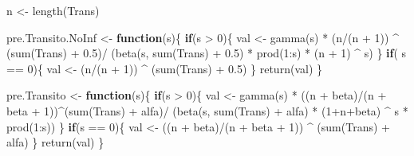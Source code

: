 \documentclass[
  12pt,
  spanish,
]{book}
\newenvironment{Shaded}{\begin{snugshade}}{\end{snugshade}}
\newcommand{\ControlFlowTok}[1]{\textcolor[rgb]{0.13,0.29,0.53}{\textbf{#1}}}
\newcommand{\DecValTok}[1]{\textcolor[rgb]{0.00,0.00,0.81}{#1}}
\newcommand{\FloatTok}[1]{\textcolor[rgb]{0.00,0.00,0.81}{#1}}
\newcommand{\FunctionTok}[1]{\textcolor[rgb]{0.00,0.00,0.00}{#1}}
\newcommand{\NormalTok}[1]{#1}
\newcommand{\OtherTok}[1]{\textcolor[rgb]{0.56,0.35,0.01}{#1}}
\newcommand{\SpecialCharTok}[1]{\textcolor[rgb]{0.00,0.00,0.00}{#1}}
\theoremstyle{definition}
\theoremstyle{definition}
\theoremstyle{definition}
\theoremstyle{definition}
\theoremstyle{remark}
\begin{document}
\begin{Shaded}
\begin{Highlighting}[]
\NormalTok{n }\OtherTok{\textless{}{-}} \FunctionTok{length}\NormalTok{(Trans)}

\NormalTok{pre.Transito.NoInf }\OtherTok{\textless{}{-}} \ControlFlowTok{function}\NormalTok{(s)\{}
  \ControlFlowTok{if}\NormalTok{(s }\SpecialCharTok{\textgreater{}} \DecValTok{0}\NormalTok{)\{}
\NormalTok{    val }\OtherTok{\textless{}{-}} \FunctionTok{gamma}\NormalTok{(s) }\SpecialCharTok{*} 
\NormalTok{      (n}\SpecialCharTok{/}\NormalTok{(n }\SpecialCharTok{+} \DecValTok{1}\NormalTok{)) }\SpecialCharTok{\^{}}\NormalTok{ (}\FunctionTok{sum}\NormalTok{(Trans) }\SpecialCharTok{+} \FloatTok{0.5}\NormalTok{)}\SpecialCharTok{/}
\NormalTok{      (}\FunctionTok{beta}\NormalTok{(s, }\FunctionTok{sum}\NormalTok{(Trans) }\SpecialCharTok{+} \FloatTok{0.5}\NormalTok{) }\SpecialCharTok{*} 
         \FunctionTok{prod}\NormalTok{(}\DecValTok{1}\SpecialCharTok{:}\NormalTok{s) }\SpecialCharTok{*}\NormalTok{ (n }\SpecialCharTok{+} \DecValTok{1}\NormalTok{) }\SpecialCharTok{\^{}}\NormalTok{ s)}
\NormalTok{  \}}
  \ControlFlowTok{if}\NormalTok{( s }\SpecialCharTok{==} \DecValTok{0}\NormalTok{)\{}
\NormalTok{    val }\OtherTok{\textless{}{-}}\NormalTok{ (n}\SpecialCharTok{/}\NormalTok{(n }\SpecialCharTok{+} \DecValTok{1}\NormalTok{)) }\SpecialCharTok{\^{}}\NormalTok{ (}\FunctionTok{sum}\NormalTok{(Trans) }\SpecialCharTok{+} \FloatTok{0.5}\NormalTok{)}
\NormalTok{  \}}
  \FunctionTok{return}\NormalTok{(val)}
\NormalTok{\}}

\NormalTok{pre.Transito }\OtherTok{\textless{}{-}} \ControlFlowTok{function}\NormalTok{(s)\{}
  \ControlFlowTok{if}\NormalTok{(s }\SpecialCharTok{\textgreater{}} \DecValTok{0}\NormalTok{)\{}
\NormalTok{    val }\OtherTok{\textless{}{-}} \FunctionTok{gamma}\NormalTok{(s) }\SpecialCharTok{*} 
\NormalTok{      ((n }\SpecialCharTok{+}\NormalTok{ beta)}\SpecialCharTok{/}\NormalTok{(n }\SpecialCharTok{+}\NormalTok{ beta }\SpecialCharTok{+} \DecValTok{1}\NormalTok{))}\SpecialCharTok{\^{}}\NormalTok{(}\FunctionTok{sum}\NormalTok{(Trans) }\SpecialCharTok{+}\NormalTok{ alfa)}\SpecialCharTok{/}
\NormalTok{      (}\FunctionTok{beta}\NormalTok{(s, }\FunctionTok{sum}\NormalTok{(Trans) }\SpecialCharTok{+}\NormalTok{ alfa) }\SpecialCharTok{*}\NormalTok{ (}\DecValTok{1}\SpecialCharTok{+}\NormalTok{n}\SpecialCharTok{+}\NormalTok{beta) }\SpecialCharTok{\^{}}\NormalTok{ s }\SpecialCharTok{*} 
         \FunctionTok{prod}\NormalTok{(}\DecValTok{1}\SpecialCharTok{:}\NormalTok{s))}
\NormalTok{  \}}
  \ControlFlowTok{if}\NormalTok{(s }\SpecialCharTok{==} \DecValTok{0}\NormalTok{)\{}
\NormalTok{    val }\OtherTok{\textless{}{-}}\NormalTok{ ((n }\SpecialCharTok{+}\NormalTok{ beta)}\SpecialCharTok{/}\NormalTok{(n }\SpecialCharTok{+}\NormalTok{ beta }\SpecialCharTok{+} \DecValTok{1}\NormalTok{)) }\SpecialCharTok{\^{}}\NormalTok{ (}\FunctionTok{sum}\NormalTok{(Trans) }\SpecialCharTok{+}\NormalTok{ alfa)}
\NormalTok{    \}}
  \FunctionTok{return}\NormalTok{(val)}
\NormalTok{\}}


\end{Highlighting}
\end{Shaded}
\end{document}
